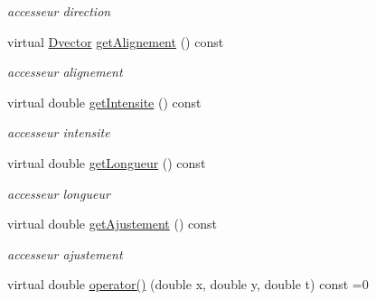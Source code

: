 \begin{DoxyCompactItemize}
\begin{DoxyCompactList}\small\item\em accesseur direction \end{DoxyCompactList}\item 
\hypertarget{classWaveModel_a2071bf319952d0a92b8724e930304261}{virtual \hyperlink{classDvector}{Dvector} \hyperlink{classWaveModel_a2071bf319952d0a92b8724e930304261}{get\-Alignement} () const }\label{classWaveModel_a2071bf319952d0a92b8724e930304261}

\begin{DoxyCompactList}\small\item\em accesseur alignement \end{DoxyCompactList}\item 
\hypertarget{classWaveModel_ae89da87502a9d4aed28897622a4388b7}{virtual double \hyperlink{classWaveModel_ae89da87502a9d4aed28897622a4388b7}{get\-Intensite} () const }\label{classWaveModel_ae89da87502a9d4aed28897622a4388b7}

\begin{DoxyCompactList}\small\item\em accesseur intensite \end{DoxyCompactList}\item 
\hypertarget{classWaveModel_a4fb84ba8f4904d1da2141faf787288c2}{virtual double \hyperlink{classWaveModel_a4fb84ba8f4904d1da2141faf787288c2}{get\-Longueur} () const }\label{classWaveModel_a4fb84ba8f4904d1da2141faf787288c2}

\begin{DoxyCompactList}\small\item\em accesseur longueur \end{DoxyCompactList}\item 
\hypertarget{classWaveModel_a511f75ab038ce7e25626dd8978d04705}{virtual double \hyperlink{classWaveModel_a511f75ab038ce7e25626dd8978d04705}{get\-Ajustement} () const }\label{classWaveModel_a511f75ab038ce7e25626dd8978d04705}

\begin{DoxyCompactList}\small\item\em accesseur ajustement \end{DoxyCompactList}\item 
\hypertarget{classWaveModel_a66612d80d52ef2619c7437f6ef26ac86}{virtual double \hyperlink{classWaveModel_a66612d80d52ef2619c7437f6ef26ac86}{operator()} (double x, double y, double t) const =0}\label{classWaveModel_a66612d80d52ef2619c7437f6ef26ac86}


\end{DoxyCompactItemize}
